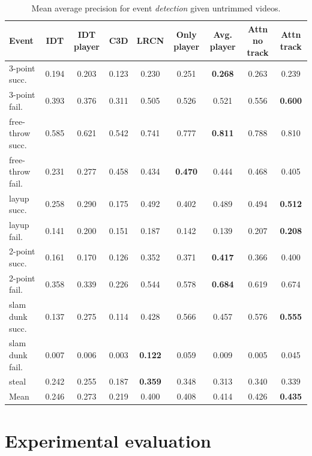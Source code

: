 \begin{table}[ht!]
\begin{center}
\small
 \begin{tabular}{|l|c|c|c|c|c|c|c|c|}
  \hline
Event & IDT\cite{Wang_CVPR11} & IDT player\cite{Wang_CVPR11} & C3D \cite{Tran_arxiv14} & LRCN \cite{Donahue_arxiv14} & Only player & Avg. player & Attn no track & Attn track \\ \hline \hline
3-point succ.    & 0.194  & 0.203 &  0.123 & 0.230 & 0.251 & \textbf{0.268} & 0.263 & 0.239 \\
3-point fail.    & 0.393  & 0.376 &  0.311 & 0.505 & 0.526 & 0.521 & 0.556 & \textbf{0.600} \\
free-throw succ. & 0.585  & 0.621 &  0.542 & 0.741 & 0.777 & \textbf{0.811} & 0.788 & 0.810 \\
free-throw fail. & 0.231  & 0.277 &  0.458 & 0.434 & \textbf{0.470} & 0.444 & 0.468 & 0.405 \\
layup succ.      & 0.258  & 0.290 &  0.175 & 0.492 & 0.402 & 0.489 & 0.494 & \textbf{0.512} \\
layup fail.      & 0.141  & 0.200 &  0.151 & 0.187 & 0.142 & 0.139 & 0.207 & \textbf{0.208} \\
2-point succ.    & 0.161  & 0.170 &  0.126 & 0.352 & 0.371 & \textbf{0.417} & 0.366 & 0.400 \\
2-point fail.    & 0.358  & 0.339 &  0.226 & 0.544 & 0.578 & \textbf{0.684} & 0.619 & 0.674 \\
  slam dunk succ.& 0.137  & 0.275 &  0.114 & 0.428 & 0.566 & 0.457 & 0.576 & \textbf{0.555} \\
slam dunk fail.  & 0.007  & 0.006 &  0.003 & \textbf{0.122} & 0.059 & 0.009 & 0.005 & 0.045 \\
steal            & 0.242  & 0.255 &  0.187 & \textbf{0.359} & 0.348 & 0.313 & 0.340 & 0.339 \\ \hline \hline
Mean             & 0.246  & 0.273 &  0.219 & 0.400 & 0.408 & 0.414 & 0.426 & \textbf{0.435} \\ \hline
  \end{tabular}
\end{center}
  \caption{Mean average precision for event {\em detection} given
    untrimmed videos.}
  \label{tab:detection_res}
\end{table}

\section{Experimental evaluation}
\label{sec:experiments}

